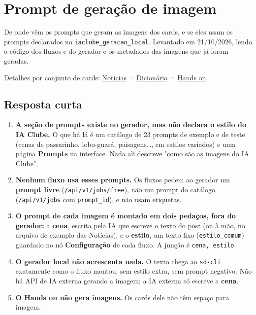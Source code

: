 
\section{Prompt de geração de imagem}\label{sec:visao-geral}

De onde vêm os prompts que geram as imagens dos cards, e se eles usam os prompts declarados no \nolinkurl{iaclube_geracao_local}. Levantado em 21/10/2026, lendo o código dos fluxos e do gerador e os metadados das imagens que já foram geradas.

Detalhes por conjunto de cards: \hyperref[sec:noticias]{Notícias} · \hyperref[sec:dicionario]{Dicionário} · \hyperref[sec:hands-on]{Hands on}.

\subsection*{Resposta curta}

\begin{enumerate}
\item 
\textbf{A seção de prompts existe no gerador, mas não declara o estilo do IA Clube.} O que há lá é um catálogo de 23 prompts de exemplo e de teste (cenas de passarinho, lobo-guará, paisagens…, em estilos variados) e uma página \textbf{Prompts} na interface. Nada ali descreve "como são as imagens do IA Clube".


\item 
\textbf{Nenhum fluxo usa esses prompts.} Os fluxos pedem ao gerador um \textbf{prompt livre} (\nolinkurl{/api/v1/jobs/free}), não um prompt do catálogo (\nolinkurl{/api/v1/jobs} com \nolinkurl{prompt_id}), e não usam etiquetas.


\item 
\textbf{O prompt de cada imagem é montado em dois pedaços, fora do gerador:} a \textbf{cena}, escrita pela IA que escreve o texto do post (ou à mão, no arquivo de exemplo das Notícias), e o \textbf{estilo}, um texto fixo (\nolinkurl{estilo_comum}) guardado no nó \textbf{Configuração} de cada fluxo. A junção é \texttt{cena, estilo}.


\item 
\textbf{O gerador local não acrescenta nada.} O texto chega ao \nolinkurl{sd-cli} exatamente como o fluxo montou: sem estilo extra, sem prompt negativo. Não há API de IA externa gerando a imagem; a IA externa só escreve a \textbf{cena}.


\item 
\textbf{O Hands on não gera imagens.} Os cards dele não têm espaço para imagem.


\end{enumerate}

